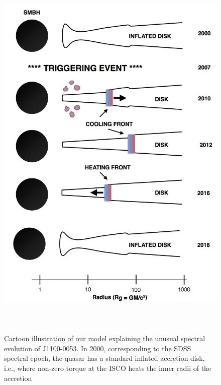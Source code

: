 \documentclass{nature}
\begin{document}
\begin{figure}
  \includegraphics[width=15.4cm, height=18.75cm, trim=0.0cm 0.0cm 0.0cm 0.0cm, clip]
  {../plots/models/cartoon_v3pnt1.jpg}
  \centering
  \caption[]{
    Cartoon illustration of our model explaining the unusual spectral
evolution of J1100-0053. In 2000, corresponding to the SDSS spectral
epoch, the quasar has a standard inflated accretion disk, i.e., where
non-zero torque at the ISCO heats the inner radii of the accretion
}
\end{figure}
\end{document}

